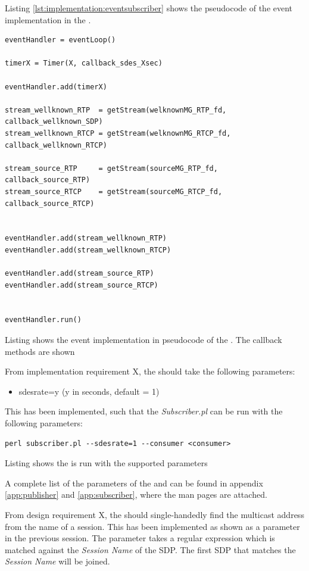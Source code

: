 Listing \ref{lst:implementation:eventsubscriber} shows the pseudocode of the event implementation in the \sub{}.
\begin{listing}[H] 
\begin{verbatim}
eventHandler = eventLoop()
	
timerX = Timer(X, callback_sdes_Xsec)
	
eventHandler.add(timerX)
	
stream_wellknown_RTP  = getStream(welknownMG_RTP_fd, callback_wellknown_SDP)
stream_wellknown_RTCP = getStream(welknownMG_RTCP_fd, callback_wellknown_RTCP)

stream_source_RTP     = getStream(sourceMG_RTP_fd, callback_source_RTP)
stream_source_RTCP    = getStream(sourceMG_RTCP_fd, callback_source_RTCP)


eventHandler.add(stream_wellknown_RTP)
eventHandler.add(stream_wellknown_RTCP)

eventHandler.add(stream_source_RTP)
eventHandler.add(stream_source_RTCP)

	
eventHandler.run()
\end{verbatim}
\caption{Listing shows the event implementation in pseudocode of the \pub{}. The callback methods are shown}
\label{lst:implementation:eventsubscriber}
\end{listing}

From implementation requirement X, the \sub{} should take the following parameters:

\begin{itemize}
	\item sdesrate=y (y in seconds, default = 1)
\end{itemize}

This has been implemented, such that the \textit{Subscriber.pl} can be run with the following parameters:
\begin{listing}[h] 
\begin{verbatim}
perl subscriber.pl --sdesrate=1 --consumer <consumer>
\end{verbatim}
\caption{Listing shows the \sub{} is run with the supported parameters}
\label{lst:implementation:parameterspublisher}
\end{listing}


\noindent{}A complete list of the parameters of the \pub{} and \sub{} can be found in appendix \ref{app:publisher} and \ref{app:subscriber}, where the man pages are attached.

From design requirement X, the \sub{} should single-handedly find the multicast address from the name of a session. This has been implemented as shown as a parameter in the previous session. The parameter takes a regular expression which is matched against the \textit{Session Name} of the SDP. The first SDP that matches the \textit{Session Name} will be joined.


